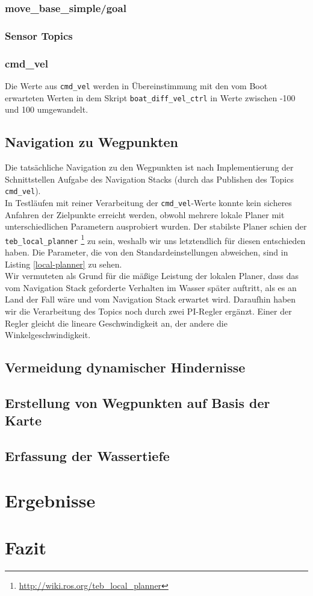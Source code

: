 \documentclass[11pt]{article}
\begin{document}
\subsubsection{move\_base\_simple/goal}
\subsubsection{Sensor Topics}
\subsubsection{cmd\_vel} \label{cmd}
Die Werte aus \texttt{cmd\_vel} werden in Übereinstimmung mit den vom Boot erwarteten Werten in dem Skript \texttt{boat\_diff\_vel\_ctrl} in Werte zwischen -100 und 100 umgewandelt.

\subsection{Navigation zu Wegpunkten}

Die tatsächliche Navigation zu den Wegpunkten ist nach Implementierung der Schnittstellen Aufgabe des Navigation Stacks (durch das Publishen des Topics \texttt{cmd\_vel}).\\
In Testläufen mit reiner Verarbeitung der \texttt{cmd\_vel}-Werte konnte kein sicheres Anfahren der Zielpunkte erreicht werden, obwohl mehrere lokale Planer mit unterschiedlichen Parametern ausprobiert wurden. Der stabilste Planer schien der \texttt{teb\_local\_planner} \footnote{\url{http://wiki.ros.org/teb_local_planner}} zu sein, weshalb wir uns letztendlich für diesen entschieden haben. Die Parameter, die von den Standardeinstellungen abweichen, sind in Listing \ref{local-planner} zu sehen.\\

Wir vermuteten als Grund für die mäßige Leistung der lokalen Planer, dass das vom Navigation Stack geforderte Verhalten im Wasser später auftritt, als es an Land der Fall wäre und vom Navigation Stack erwartet wird. Daraufhin haben wir die Verarbeitung des Topics noch durch zwei PI-Regler ergänzt. Einer der Regler gleicht die lineare Geschwindigkeit an, der andere die Winkelgeschwindigkeit.
\subsection{Vermeidung dynamischer Hindernisse}
\subsection{Erstellung von Wegpunkten auf Basis der Karte}
\subsection{Erfassung der Wassertiefe}

\section{Ergebnisse}
\section{Fazit}
{}

\end{document}
